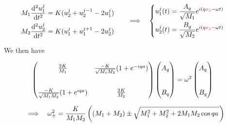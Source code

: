 \begin{frame}
  \begin{equation*}
    \begin{aligned}
      M_1 \frac{\mathrm{d}^2 u^{j}_1}{\mathrm{d}t^2} &= K (u^{j}_2 + u^{j-1}_2 - 2u^{j}_1) \cr
      M_2 \frac{\mathrm{d}^2 u^{j}_2}{\mathrm{d}t^2} &= K (u^{j}_1 + u^{j+1}_1 - 2u^{j}_2)
    \end{aligned}
    \quad \Longrightarrow \quad%
    \left\{
    \begin{aligned}
      u^{j}_1(t) &= \frac{A_q}{\sqrt{M_1}} e^{i(q\mathcolor{red}{x_j} - \omega t)} \cr
      u^{j}_2(t) &= \frac{B_q}{\sqrt{M_2}} e^{i(q\mathcolor{red}{x_j} - \omega t)} \cr
    \end{aligned}
    \right.
  \end{equation*}

  We then have

    \begin{equation*}
      \begin{aligned}
        \begin{pmatrix}
            \renewcommand*{\arraystretch}{1.5}
            \frac{2K}{M_1} & \frac{-K}{\sqrt{M_1M_2}}(1+e^{-iqa}) \\
            \phantom{.} \\
            \frac{-K}{\sqrt{M_1M_2}}(1+e^{iqa}) & \frac{2K}{M_2}
        \end{pmatrix}
        \begin{pmatrix}
        A_q \\
        \phantom{a} \\
        B_q 
        \end{pmatrix}
        &=
        \omega^2
        \begin{pmatrix}
        A_q \\
        \phantom{a} \\
        B_q 
        \end{pmatrix}
      \end{aligned}
    \end{equation*}
    
    \medskip
    \begin{equation*}
      \Longrightarrow \quad \omega_\pm^2 = {K\over M_1M_2} \left((M_1 + M_2) \pm \sqrt{M_1^2 + M_2^2 + 2M_1M_2\cos{qa}\,}\right)
    \end{equation*}
\end{frame}
